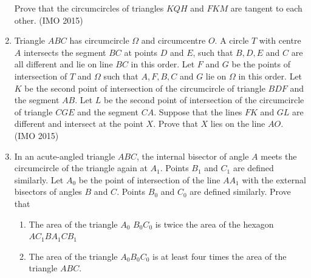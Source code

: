 \begin{enumerate}[label=\thesubsection.\arabic*,ref=\thesubsection.\theenumi]
	Prove that the circumcircles of triangles $KQH$ and $FKM$ are tangent to each other. \hfill(IMO 2015)
\item  Triangle $ABC$ has circumcircle $\Omega$ and circumcentre $O$. A circle $T$ with centre $A$ intersects the segment $BC$ at points $D$ and $E$, such that $B, D, E $ and $C$ are all different and lie on line $BC$ in this order. Let $F$ and $G$ be the points of intersection of $T$ and $\Omega$ such that $A, F, B, C$ and $G$ lie on $\Omega$ in this order. Let $K $ be the second point of intersection of the circumcircle of triangle $BDF$ and the segment $AB$. Let $L$ be the second point of intersection of the circumcircle of triangle $CGE$ and the segment $CA$.
	Suppose that the lines $FK$ and $GL$ are different and intersect at the point $X$. Prove that $X$ lies on the line $AO$. \hfill(IMO  2015)
\item In an acute-angled triangle $ABC$, the internal bisector of angle $A$ meets the circumcircle of the triangle again at $A_1$. Points $B_1$ and $C_1$ are defined similarly. Let $A_0$ be the point of intersection of the line $AA_1$ with the external bisectors of angles $B$ and $C$. Points $B_0$ and $C_0$ are defined similarly. Prove that
\begin{enumerate}
\item The area of the triangle $A_0$ $B_0C_0$ is twice the area of the hexagon $AC_1BA_1CB_1$
\item  The area of the triangle $A_0B_0C_0$ is at least four times the area of the triangle $ABC$. 


\end{enumerate}
\end{enumerate}
